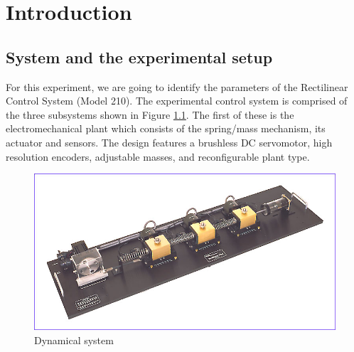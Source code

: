 \chapter{Introduction}
\label{chap:Introduction}

\section{System and the experimental setup}
\label{sec:intro1}

For this experiment, we are going to identify the parameters of the Rectilinear
Control System (Model 210).
The experimental control system is comprised of the three subsystems shown in 
Figure \ref{fig:dynamicalsystem}. The first of these is the electromechanical 
plant which consists of the spring/mass mechanism, its actuator and sensors. 
The design features a brushless DC servomotor, high resolution encoders, 
adjustable masses, and reconfigurable plant type.
%
\begin{figure}[ht]
\centering
\includegraphics[width=0.8\linewidth]{linlrge}
\caption{Dynamical system}
\label{fig:dynamicalsystem}
\end{figure}
